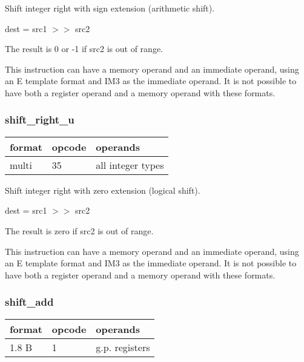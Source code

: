\documentclass[forwardcom.tex]{subfiles}
\begin{document}
Shift integer right with sign extension (arithmetic shift).

dest = src1 $>>$ src2
\vspace{2mm}

The result is 0 or -1 if src2 is out of range.
\vspace{2mm}

This instruction can have a memory operand and an immediate operand, using an E template format and IM3  as the immediate operand. It is not possible to have both a register operand and a memory operand with these formats.
\vspace{2mm}

\subsubsection{shift\_right\_u}
\label{table:shiftRightUInstruction}
\begin{tabular}{|p{12mm}|p{12mm}|p{110mm}|}
\hline
\bfseries format & \bfseries opcode & \bfseries operands \\ \hline
multi & 35 & all integer types \\ \hline
\end{tabular}
\vspace{2mm}

Shift integer right with zero extension (logical shift).

dest = src1 $>>$ src2
\vspace{2mm}

The result is zero if src2 is out of range.
\vspace{2mm}

This instruction can have a memory operand and an immediate operand, using an E template format and IM3  as the immediate operand. It is not possible to have both a register operand and a memory operand with these formats.
\vspace{2mm}

\subsubsection{shift\_add}
\label{table:shiftAddInstruction}
\begin{tabular}{|p{12mm}|p{12mm}|p{110mm}|}
\hline
\bfseries format & \bfseries opcode & \bfseries operands \\ \hline
1.8 B &  1 & g.p. registers \\ \hline
\end{tabular}
\vspace{2mm}
\end{document}
